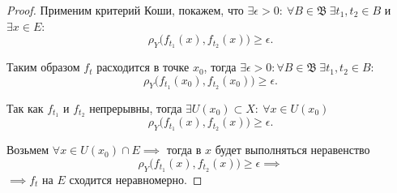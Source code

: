 \begin{proof}
    Применим критерий Коши, покажем, что $\exists \epsilon > 0: \ \forall B \in \mathfrak{B} \ \exists t_1, t_2 \in B$ и $\exists x \in E$:
    \[
        \rho_Y\big(f_{t_1}(x), f_{t_2}(x)\big) \geqslant \epsilon.
    \]

    Таким образом $f_t$ расходится в точке $x_0$, тогда $\exists \epsilon > 0: \forall B \in \mathfrak{B} \ \exists t_1,t_2 \in B$:
    \[
        \rho_Y\big(f_{t_1}(x_0), f_{t_2}(x_0)\big) \geqslant \epsilon.
    \]

    Так как $f_{t_1}$ и $f_{t_2}$ непрерывны, тогда $\exists U(x_0)\subset X: \ \forall x \in U(x_0)$
    \[
        \rho_Y\big(f_{t_1}(x), f_{t_2}(x)\big) \geqslant \epsilon.
    \]

    Возьмем $\forall x \in U(x_0) \cap E \implies$ тогда в $x$ будет выполняться неравенство
    \[
        \rho_Y\big(f_{t_1}(x), f_{t_2}(x)\big)\geqslant \epsilon \implies
    \]
    $\implies f_t$ на $E$ сходится неравномерно.
\end{proof}